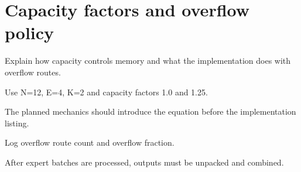 \section{Capacity factors and overflow policy}
\label{sec:ch06-capacity-factors-and-overflow-policy}

Explain how capacity controls memory and what the implementation does with overflow routes.



Use N=12, E=4, K=2 and capacity factors 1.0 and 1.25.



The planned mechanics should introduce the equation before the implementation listing.





\begin{checkpointbox}
Log overflow route count and overflow fraction.
\end{checkpointbox}

After expert batches are processed, outputs must be unpacked and combined.
